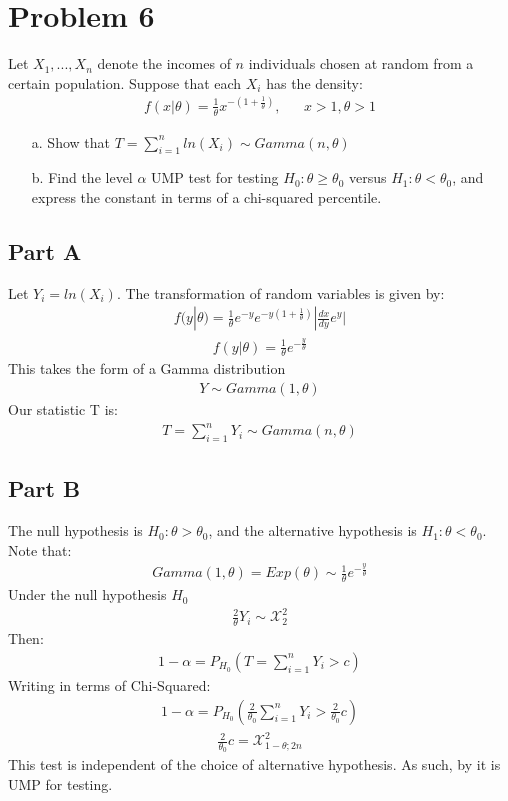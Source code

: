 \documentclass{article}
\begin{document}
\section*{Problem 6}
Let $X_1,...,X_n$ denote the incomes of $n$ individuals chosen at random from a certain population. Suppose that each $X_i$ has the density:
\begin{align*}
f(x|\theta) = \frac{1}{\theta} x^{-(1+\frac{1}{\theta})}, && x>1, \theta>1
\end{align*}
\begin{enumerate}
\item[a.] Show that $T=\sum_{i=1}^{n} ln(X_i) \sim Gamma(n,\theta)$
\item[b.]  Find the level $\alpha$ UMP test for testing $H_0:\theta \geq \theta_0$ versus $H_1: \theta < \theta_0$, and express the constant in terms of a chi-squared percentile.
\end{enumerate}
\subsection*{Part A}
Let $Y_i=ln(X_i)$. The transformation of random variables is given by:
\begin{align*}
f(y|\theta) = \frac{1}{\theta} e^{-y} e^{-y(1+\frac{1}{\theta})} |\frac{dx}{dy}e^y|
\end{align*}
\begin{align*}
f(y|\theta) = \frac{1}{\theta} e^{-\frac{y}{\theta}}
\end{align*}
This takes the form of a Gamma distribution
\begin{align*}
Y \sim Gamma(1,\theta)
\end{align*}
Our statistic T is:
\begin{align*}
\boxed{ T = \sum_{i=1}^{n} Y_i \sim Gamma(n,\theta) }
\end{align*}
\subsection*{Part B}
The null hypothesis is $H_0: \theta > \theta_0$, and the alternative hypothesis is $H_1:\theta < \theta_0$. Note that:
\begin{align*}
Gamma(1,\theta) = Exp(\theta) \sim \frac{1}{\theta} e^{-\frac{y}{\theta}}
\end{align*}
Under the null hypothesis $H_0$
\begin{align*}
\frac{2}{\theta} Y_i \sim \mathcal{X}_{2}^{2}
\end{align*}
Then:
\begin{align*}
1-\alpha = P_{H_{0}}(T = \sum_{i=1}^{n} Y_i > c)
\end{align*}
Writing in terms of Chi-Squared:
\begin{align*}
1-\alpha = P_{H_{0}}(\frac{2}{\theta_0} \sum_{i=1}^{n} Y_i > \frac{2}{\theta_0} c)
\end{align*}
\begin{align*}
\frac{2}{\theta_0} c = \mathcal{X}_{1-\theta;2n}^{2}
\end{align*}
This test is independent of the choice of alternative hypothesis. As such, by it is UMP for testing.
\end{document}
